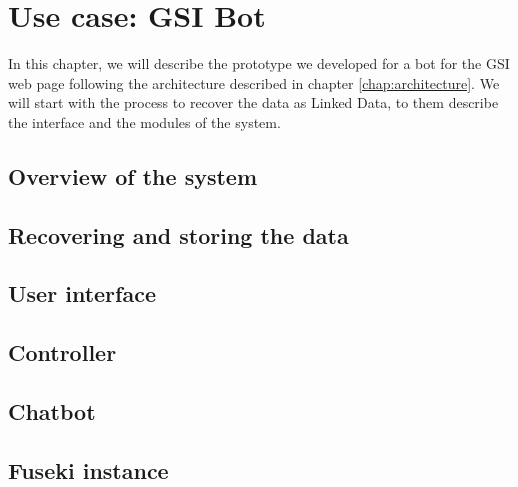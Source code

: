 \chapter{Use case: GSI Bot}
\label{chap:usecasegsi}

\begin{chapterintro}

In this chapter, we will describe the prototype we developed for a bot for the GSI web page following the architecture described in chapter \ref{chap:architecture}. We will start with the process to recover the data as Linked Data, to them describe the interface and the modules of the system.
 
\end{chapterintro}

\cleardoublepage

\section{Overview of the system}

\section{Recovering and storing the data}

\section{User interface}

\section{Controller}

\section{Chatbot}

\section{Fuseki instance}